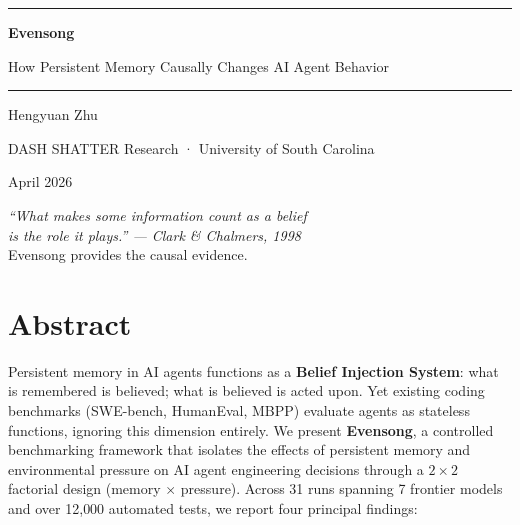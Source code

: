\documentclass[11pt, a4paper]{article}
\begin{document}
\thispagestyle{empty}

\begin{center}
\vspace*{35mm}

{\color{deep}\rule{0.6\textwidth}{1pt}}

\vspace{8mm}

{\fontsize{28pt}{34pt}\selectfont\sffamily\bfseries\color{deep}%
Evensong}

\vspace{4mm}

{\fontsize{13pt}{18pt}\selectfont\sffamily\color{faded}%
How Persistent Memory Causally Changes AI Agent Behavior}

\vspace{8mm}

{\color{deep}\rule{0.6\textwidth}{1pt}}

\vspace{14mm}

{\large\sffamily\color{deep!80} Hengyuan Zhu}

\vspace{3mm}

{\sffamily\color{faded} DASH SHATTER Research · University of South Carolina}

\vspace{3mm}

{\sffamily\color{faded} April 2026}

\vfill

{\small\sffamily\color{faded}%
\textit{``What makes some information count as a belief}\\
\textit{is the role it plays.'' --- Clark \& Chalmers, 1998}\\[4pt]
Evensong provides the causal evidence.}

\vspace{10mm}
\end{center}

\clearpage

\pagestyle{fancy}
\section*{Abstract}

Persistent memory in AI agents functions as a \textbf{Belief Injection System}: what is remembered is believed; what is believed is acted upon. Yet existing coding benchmarks (SWE-bench, HumanEval, MBPP) evaluate agents as stateless functions, ignoring this dimension entirely. We present \textbf{Evensong}, a controlled benchmarking framework that isolates the effects of persistent memory and environmental pressure on AI agent engineering decisions through a $2 \times 2$ factorial design (memory $\times$ pressure). Across 31 runs spanning 7 frontier models and over 12{,}000 automated tests, we report four principal findings:
\end{document}
